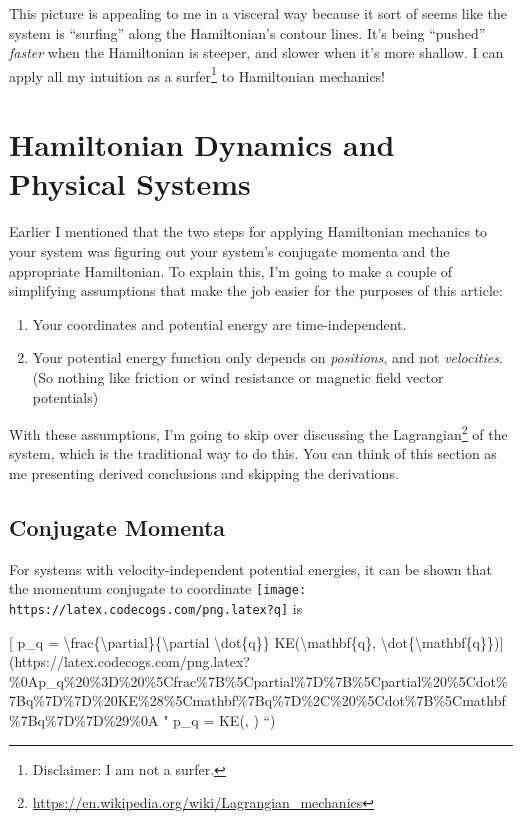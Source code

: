 \documentclass[]{article}
\renewcommand{\href}[2]{#2\footnote{\url{#1}}}
\begin{document}
This picture is appealing to me in a visceral way because it sort of seems like
the system is ``surfing'' along the Hamiltonian's contour lines. It's being
``pushed'' \emph{faster} when the Hamiltonian is steeper, and slower when it's
more shallow. I can apply all my intuition as a surfer\footnote{Disclaimer: I am
  not a surfer.} to Hamiltonian mechanics!

\section{Hamiltonian Dynamics and Physical
Systems}\label{hamiltonian-dynamics-and-physical-systems}

Earlier I mentioned that the two steps for applying Hamiltonian mechanics to
your system was figuring out your system's conjugate momenta and the appropriate
Hamiltonian. To explain this, I'm going to make a couple of simplifying
assumptions that make the job easier for the purposes of this article:

\begin{enumerate}
\def\labelenumi{\arabic{enumi}.}
\tightlist
\item
  Your coordinates and potential energy are time-independent.
\item
  Your potential energy function only depends on \emph{positions}, and not
  \emph{velocities}. (So nothing like friction or wind resistance or magnetic
  field vector potentials)
\end{enumerate}

With these assumptions, I'm going to skip over discussing the
\href{https://en.wikipedia.org/wiki/Lagrangian_mechanics}{Lagrangian} of the
system, which is the traditional way to do this. You can think of this section
as me presenting derived conclusions and skipping the derivations.

\subsection{Conjugate Momenta}\label{conjugate-momenta}

For systems with velocity-independent potential energies, it can be shown that
the momentum conjugate to coordinate
\texttt{[image: https://latex.codecogs.com/png.latex?q]} is

{[} p\_q =
\textbackslash{}frac\{\textbackslash{}partial\}\{\textbackslash{}partial
\textbackslash{}dot\{q\}\} KE(\textbackslash{}mathbf\{q\},
\textbackslash{}dot\{\textbackslash{}mathbf\{q\}\}){]}(https://latex.codecogs.com/png.latex?\%0Ap\_q\%20\%3D\%20\%5Cfrac\%7B\%5Cpartial\%7D\%7B\%5Cpartial\%20\%5Cdot\%7Bq\%7D\%7D\%20KE\%28\%5Cmathbf\%7Bq\%7D\%2C\%20\%5Cdot\%7B\%5Cmathbf\%7Bq\%7D\%7D\%29\%0A
" p\_q =  KE(, ) ``)
\end{document}
